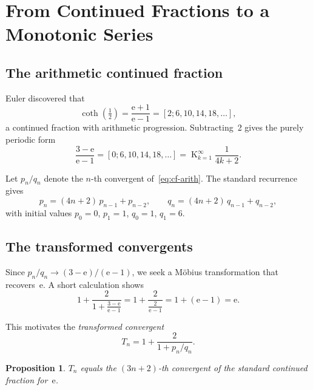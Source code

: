 \documentclass[11pt]{article}
\newtheorem{proposition}[theorem]{Proposition}
\theoremstyle{definition}
\theoremstyle{remark}
\newcommand{\ee}{\mathrm{e}}
\newcommand{\Kfrac}{\mathop{\mathrm{K}}}
\begin{document}
\section{From Continued Fractions to a Monotonic Series}

\subsection{The arithmetic continued fraction}

Euler discovered that~\cite{Euler1737,OEIS-A016825}
\begin{equation}\label{eq:coth-cf}
\coth\!\left(\tfrac{1}{2}\right) = \frac{\ee + 1}{\ee - 1} = [2; 6, 10, 14, 18, \ldots],
\end{equation}
a continued fraction with arithmetic progression. Subtracting~2 gives the
purely periodic form
\begin{equation}\label{eq:cf-arith}
\frac{3 - \ee}{\ee - 1} = [0; 6, 10, 14, 18, \ldots]
= \Kfrac_{k=1}^{\infty} \frac{1}{4k+2}.
\end{equation}

Let $p_n/q_n$ denote the $n$-th convergent of~\eqref{eq:cf-arith}. The standard
recurrence gives
\begin{equation}\label{eq:recurrence}
p_n = (4n+2)\, p_{n-1} + p_{n-2}, \qquad
q_n = (4n+2)\, q_{n-1} + q_{n-2},
\end{equation}
with initial values $p_0 = 0$, $p_1 = 1$, $q_0 = 1$, $q_1 = 6$.

\subsection{The transformed convergents}

Since $p_n/q_n \to (3-\ee)/(\ee-1)$, we seek a M\"obius transformation that
recovers~$\ee$. A short calculation shows
\[
1 + \frac{2}{1 + \frac{3-\ee}{\ee-1}}
= 1 + \frac{2}{\frac{2}{\ee-1}}
= 1 + (\ee - 1) = \ee.
\]

This motivates the \emph{transformed convergent}
\begin{equation}\label{eq:T-def}
T_n = 1 + \frac{2}{1 + p_n/q_n}.
\end{equation}

\begin{proposition}
$T_n$ equals the $(3n+2)$-th convergent of the standard continued fraction
for~$\ee$.
\end{proposition}
\end{document}
